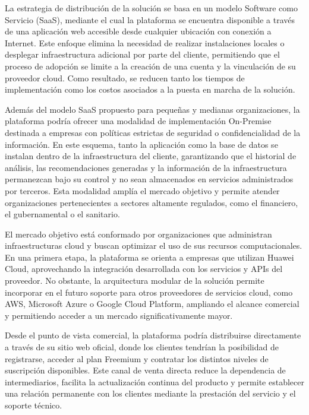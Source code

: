 La estrategia de distribución de la solución se basa en un modelo Software como Servicio (SaaS), mediante el cual la plataforma se encuentra disponible a través de una aplicación web accesible desde cualquier ubicación con conexión a Internet. Este enfoque elimina la necesidad de realizar instalaciones locales o desplegar infraestructura adicional por parte del cliente, permitiendo que el proceso de adopción se limite a la creación de una cuenta y la vinculación de su proveedor cloud. Como resultado, se reducen tanto los tiempos de implementación como los costos asociados a la puesta en marcha de la solución.

Además del modelo SaaS propuesto para pequeñas y medianas organizaciones, la plataforma podría ofrecer una modalidad de implementación On-Premise destinada a empresas con políticas estrictas de seguridad o confidencialidad de la información. En este esquema, tanto la aplicación como la base de datos se instalan dentro de la infraestructura del cliente, garantizando que el historial de análisis, las recomendaciones generadas y la información de la infraestructura permanezcan bajo su control y no sean almacenados en servicios administrados por terceros. Esta modalidad amplía el mercado objetivo y permite atender organizaciones pertenecientes a sectores altamente regulados, como el financiero, el gubernamental o el sanitario.

El mercado objetivo está conformado por organizaciones que administran infraestructuras cloud y buscan optimizar el uso de sus recursos computacionales. En una primera etapa, la plataforma se orienta a empresas que utilizan Huawei Cloud, aprovechando la integración desarrollada con los servicios y APIs del proveedor. No obstante, la arquitectura modular de la solución permite incorporar en el futuro soporte para otros proveedores de servicios cloud, como AWS, Microsoft Azure o Google Cloud Platform, ampliando el alcance comercial y permitiendo acceder a un mercado significativamente mayor.

Desde el punto de vista comercial, la plataforma podría distribuirse directamente a través de su sitio web oficial, donde los clientes tendrían la posibilidad de registrarse, acceder al plan Freemium y contratar los distintos niveles de suscripción disponibles. Este canal de venta directa reduce la dependencia de intermediarios, facilita la actualización continua del producto y permite establecer una relación permanente con los clientes mediante la prestación del servicio y el soporte técnico.

